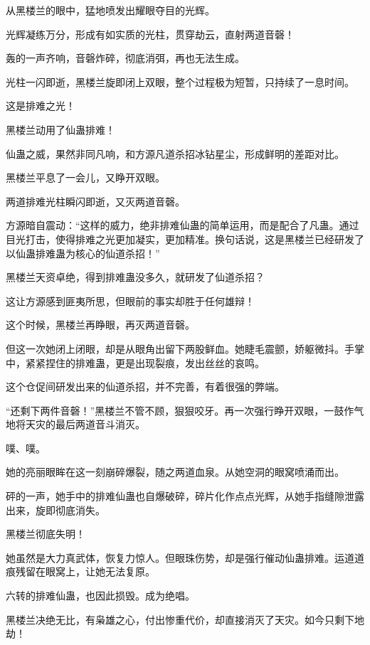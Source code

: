 
\begin{this_body}



从黑楼兰的眼中，猛地喷发出耀眼夺目的光辉。

光辉凝练万分，形成有如实质的光柱，贯穿劫云，直射两道音磬！

轰的一声齐响，音磬炸碎，彻底消弭，再也无法生成。

光柱一闪即逝，黑楼兰旋即闭上双眼，整个过程极为短暂，只持续了一息时间。

这是排难之光！

黑楼兰动用了仙蛊排难！

仙蛊之威，果然非同凡响，和方源凡道杀招冰钻星尘，形成鲜明的差距对比。

黑楼兰平息了一会儿，又睁开双眼。

两道排难光柱瞬闪即逝，又灭两道音磬。

方源暗自震动：“这样的威力，绝非排难仙蛊的简单运用，而是配合了凡蛊。通过目光打击，使得排难之光更加凝实，更加精准。换句话说，这是黑楼兰已经研发了以仙蛊排难蛊为核心的仙道杀招！”

黑楼兰天资卓绝，得到排难蛊没多久，就研发了仙道杀招？

这让方源感到匪夷所思，但眼前的事实却胜于任何雄辩！

这个时候，黑楼兰再睁眼，再灭两道音磬。

但这一次她闭上闭眼，却是从眼角出留下两股鲜血。她睫毛震颤，娇躯微抖。手掌中，紧紧捏住的排难蛊，更是出现裂痕，发出丝丝的哀鸣。

这个仓促间研发出来的仙道杀招，并不完善，有着很强的弊端。

“还剩下两件音磬！”黑楼兰不管不顾，狠狠咬牙。再一次强行睁开双眼，一鼓作气地将天灾的最后两道音斗消灭。

噗、噗。

她的亮丽眼眸在这一刻崩碎爆裂，随之两道血泉。从她空洞的眼窝喷涌而出。

砰的一声，她手中的排难仙蛊也自爆破碎，碎片化作点点光辉，从她手指缝隙泄露出来，旋即彻底消失。

黑楼兰彻底失明！

她虽然是大力真武体，恢复力惊人。但眼珠伤势，却是强行催动仙蛊排难。运道道痕残留在眼窝上，让她无法复原。

六转的排难仙蛊，也因此损毁。成为绝唱。

黑楼兰决绝无比，有枭雄之心，付出惨重代价，却直接消灭了天灾。如今只剩下地劫！


\end{this_body}
